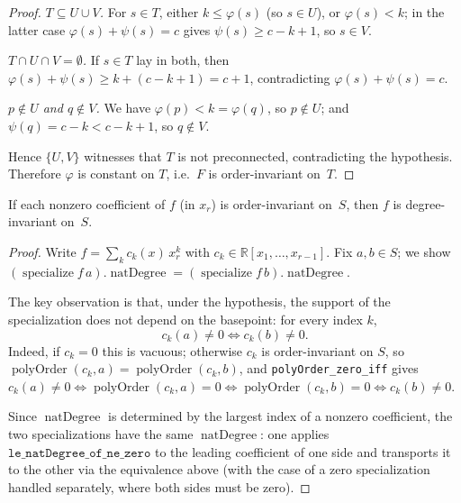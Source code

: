 \begin{proof}
  \emph{$T \subseteq U \cup V$.}  For $s \in T$, either $k \le \varphi(s)$
  (so $s \in U$), or $\varphi(s) < k$; in the latter case
  $\varphi(s) + \psi(s) = c$ gives $\psi(s) \ge c - k + 1$, so $s \in V$.

  \emph{$T \cap U \cap V = \emptyset$.}  If $s \in T$ lay in both, then
  $\varphi(s) + \psi(s) \ge k + (c - k + 1) = c + 1$, contradicting
  $\varphi(s) + \psi(s) = c$.

  \emph{$p \notin U$ and $q \notin V$.}  We have $\varphi(p) < k = \varphi(q)$,
  so $p \notin U$; and $\psi(q) = c - k < c - k + 1$, so $q \notin V$.

  Hence $\{U, V\}$ witnesses that $T$ is not preconnected, contradicting the
  hypothesis.  Therefore $\varphi$ is constant on $T$, i.e.\ $F$ is
  order-invariant on~$T$.
\end{proof}

\begin{lemma}
  \label{lem:degree_invariant_of_coeff_order_invariant}
  \leanok
  If each nonzero coefficient of $f$ (in $x_r$) is order-invariant on~$S$,
  then $f$ is degree-invariant on~$S$.
\end{lemma}
\begin{proof}
  \leanok
  Write $f = \sum_k c_k(x)\, x_r^k$ with $c_k \in \mathbb{R}[x_1,\ldots,x_{r-1}]$.
  Fix $a, b \in S$; we show
  $(\operatorname{specialize} f\, a).\operatorname{natDegree}
  = (\operatorname{specialize} f\, b).\operatorname{natDegree}$.

  The key observation is that, under the hypothesis, the support of the
  specialization does not depend on the basepoint: for every index $k$,
  \[
    c_k(a) \ne 0 \iff c_k(b) \ne 0.
  \]
  Indeed, if $c_k = 0$ this is vacuous; otherwise $c_k$ is order-invariant on
  $S$, so $\operatorname{polyOrder}(c_k, a) = \operatorname{polyOrder}(c_k, b)$,
  and \texttt{polyOrder\_zero\_iff} gives $c_k(a) \ne 0 \Leftrightarrow
  \operatorname{polyOrder}(c_k, a) = 0 \Leftrightarrow
  \operatorname{polyOrder}(c_k, b) = 0 \Leftrightarrow c_k(b) \ne 0$.

  Since $\operatorname{natDegree}$ is determined by the largest index of a
  nonzero coefficient, the two specializations have the same $\operatorname{natDegree}$:
  one applies $\texttt{le\_natDegree\_of\_ne\_zero}$ to the leading coefficient
  of one side and transports it to the other via the equivalence above
  (with the case of a zero specialization handled separately, where both sides
  must be zero).
\end{proof}

